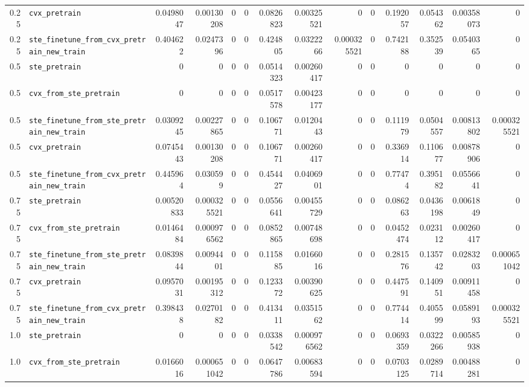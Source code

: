 \begin{longtable}{@{}r l *{12}{r}@{}}
0.25 & \texttt{cvx\_pretrain} & 0.0498047 & 0.00130208 & 0 & 0 & 0.0826823 & 0.00325521 & 0 & 0 & 0.192057 & 0.054362 & 0.00358073 & 0 \\
0.25 & \texttt{ste\_finetune\_from\_cvx\_pretrain\_new\_train} & 0.404622 & 0.0247396 & 0 & 0 & 0.424805 & 0.0322266 & 0.000325521 & 0 & 0.742188 & 0.352539 & 0.0540365 & 0 \\
0.5 & \texttt{ste\_pretrain} & 0 & 0 & 0 & 0 & 0.0514323 & 0.00260417 & 0 & 0 & 0 & 0 & 0 & 0 \\
0.5 & \texttt{cvx\_from\_ste\_pretrain} & 0 & 0 & 0 & 0 & 0.0517578 & 0.00423177 & 0 & 0 & 0 & 0 & 0 & 0 \\
0.5 & \texttt{ste\_finetune\_from\_ste\_pretrain\_new\_train} & 0.0309245 & 0.00227865 & 0 & 0 & 0.106771 & 0.0120443 & 0 & 0 & 0.111979 & 0.0504557 & 0.00813802 & 0.000325521 \\
0.5 & \texttt{cvx\_pretrain} & 0.0745443 & 0.00130208 & 0 & 0 & 0.106771 & 0.00260417 & 0 & 0 & 0.336914 & 0.110677 & 0.00878906 & 0 \\
0.5 & \texttt{ste\_finetune\_from\_cvx\_pretrain\_new\_train} & 0.445964 & 0.030599 & 0 & 0 & 0.454427 & 0.0406901 & 0 & 0 & 0.77474 & 0.395182 & 0.0556641 & 0 \\
0.75 & \texttt{ste\_pretrain} & 0.00520833 & 0.000325521 & 0 & 0 & 0.0556641 & 0.00455729 & 0 & 0 & 0.086263 & 0.0436198 & 0.0061849 & 0 \\
0.75 & \texttt{cvx\_from\_ste\_pretrain} & 0.0146484 & 0.000976562 & 0 & 0 & 0.0852865 & 0.00748698 & 0 & 0 & 0.0452474 & 0.023112 & 0.00260417 & 0 \\
0.75 & \texttt{ste\_finetune\_from\_ste\_pretrain\_new\_train} & 0.0839844 & 0.0094401 & 0 & 0 & 0.115885 & 0.0166016 & 0 & 0 & 0.281576 & 0.135742 & 0.0283203 & 0.000651042 \\
0.75 & \texttt{cvx\_pretrain} & 0.0957031 & 0.00195312 & 0 & 0 & 0.123372 & 0.00390625 & 0 & 0 & 0.447591 & 0.140951 & 0.00911458 & 0 \\
0.75 & \texttt{ste\_finetune\_from\_cvx\_pretrain\_new\_train} & 0.398438 & 0.0270182 & 0 & 0 & 0.413411 & 0.0351562 & 0 & 0 & 0.774414 & 0.405599 & 0.0589193 & 0.000325521 \\
1.0 & \texttt{ste\_pretrain} & 0 & 0 & 0 & 0 & 0.0338542 & 0.000976562 & 0 & 0 & 0.0693359 & 0.0322266 & 0.00585938 & 0 \\
1.0 & \texttt{cvx\_from\_ste\_pretrain} & 0.0166016 & 0.000651042 & 0 & 0 & 0.0647786 & 0.00683594 & 0 & 0 & 0.0703125 & 0.0289714 & 0.00488281 & 0 \\

\end{longtable}
